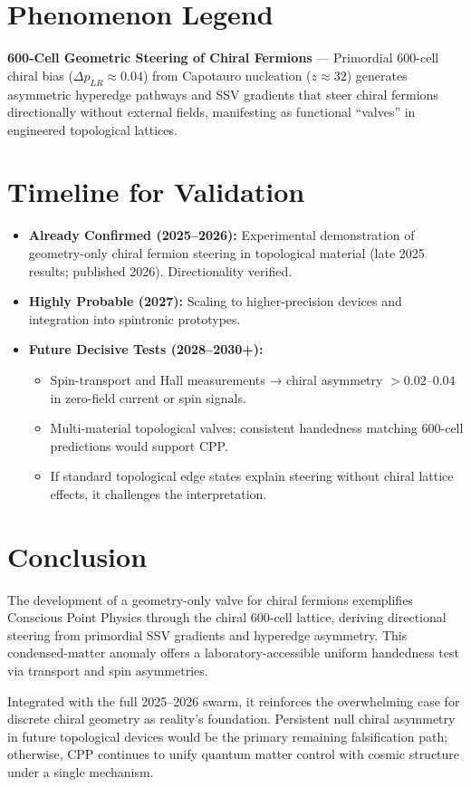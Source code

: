 \documentclass[11pt]{article}
\begin{document}
\section{Phenomenon Legend}
\textbf{600-Cell Geometric Steering of Chiral Fermions} — Primordial 600-cell chiral bias ($\Delta p_{LR} \approx 0.04$) from Capotauro nucleation ($z \approx 32$) generates asymmetric hyperedge pathways and SSV gradients that steer chiral fermions directionally without external fields, manifesting as functional ``valves'' in engineered topological lattices.

\section{Timeline for Validation}
\begin{itemize}
    \item \textbf{Already Confirmed (2025--2026):} Experimental demonstration of geometry-only chiral fermion steering in topological material (late 2025 results; published 2026). Directionality verified.
    \item \textbf{Highly Probable (2027):} Scaling to higher-precision devices and integration into spintronic prototypes.
    \item \textbf{Future Decisive Tests (2028--2030+):}
    \begin{itemize}
        \item Spin-transport and Hall measurements → chiral asymmetry $>0.02$--$0.04$ in zero-field current or spin signals.
        \item Multi-material topological valves; consistent handedness matching 600-cell predictions would support CPP.
        \item If standard topological edge states explain steering without chiral lattice effects, it challenges the interpretation.
    \end{itemize}
\end{itemize}

\section{Conclusion}
The development of a geometry-only valve for chiral fermions exemplifies Conscious Point Physics through the chiral 600-cell lattice, deriving directional steering from primordial SSV gradients and hyperedge asymmetry. This condensed-matter anomaly offers a laboratory-accessible uniform handedness test via transport and spin asymmetries.  

Integrated with the full 2025--2026 swarm, it reinforces the overwhelming case for discrete chiral geometry as reality's foundation. Persistent null chiral asymmetry in future topological devices would be the primary remaining falsification path; otherwise, CPP continues to unify quantum matter control with cosmic structure under a single mechanism.
\end{document}

